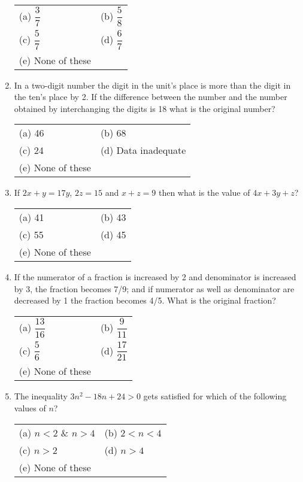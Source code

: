 \begin{multicols}{2}
\begin{enumerate}[leftmargin=*]
\begin{tabular}{l@{\qquad\quad}l}
(a) $\dfrac{3}{7}$ & (b) $\dfrac{5}{8}$ \\[0.3cm]
(c) $\dfrac{5}{7}$ & (d) $\dfrac{6}{7}$ \\
(e) None of these
\end{tabular}

\item In a two-digit number the digit in the unit's place is more than the digit in the ten's place by 2. If the difference between the number and the number obtained by interchanging the digits is 18 what is the original number?

\begin{tabular}{l@{\qquad\quad}l}
(a) 46 & (b) 68 \\
(c) 24 & (d) Data inadequate\\
(e) None of these
\end{tabular}

\item If $2x + y = 17y$, $2z = 15$ and $x + z = 9$ then what is the value of $4x + 3y + z$?

\begin{tabular}{l@{\qquad\quad}l}
(a) 41 & (b) 43 \\
(c) 55 & (d) 45 \\
(e) None of these
\end{tabular}

\item If the numerator of a fraction is increased by 2 and denominator is increased by 3, the fraction becomes 7/9; and if numerator as well as denominator are decreased by 1 the fraction becomes 4/5. What is the original fraction?

\begin{tabular}{l@{\qquad\quad}l}
(a) $\dfrac{13}{16}$ & (b) $\dfrac{9}{11}$ \\[0.3cm]
(c) $\dfrac{5}{6}$ & (d) $\dfrac{17}{21}$ \\
(e) None of these
\end{tabular}

\item The inequality $3n^2 - 18n + 24 > 0$ gets satisfied for which of the following values of $n$?

\begin{tabular}{l@{\qquad\quad}l}
(a) $n < 2$ \& $n > 4$ & (b) $2 < n < 4$ \\
(c) $n > 2$ & (d) $n > 4$ \\
(e) None of these
\end{tabular}


\end{enumerate}
\end{multicols}
